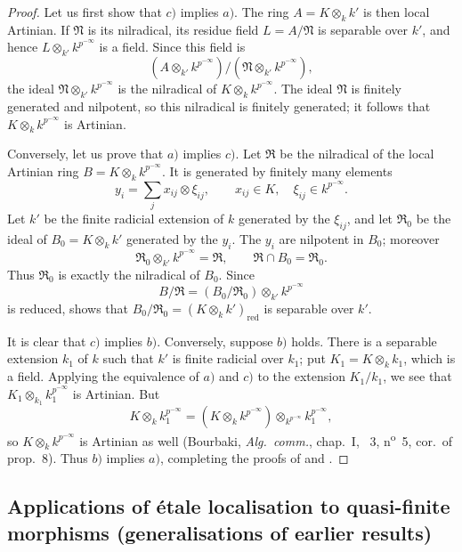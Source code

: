 \begin{proof}
Let us first show that $c)$ implies $a)$.
The ring $A=K\otimes_kk'$ is then local Artinian. If $\mathfrak N$ is its nilradical, its residue field $L=A/\mathfrak N$ is separable over $k'$, and hence $L\otimes_{k'}k^{p^{-\infty}}$ is a field. Since this field is
\[
  (A\otimes_{k'}k^{p^{-\infty}})/(\mathfrak N\otimes_{k'}k^{p^{-\infty}}),
\]
the ideal $\mathfrak N\otimes_{k'}k^{p^{-\infty}}$ is the nilradical of $K\otimes_kk^{p^{-\infty}}$. The ideal $\mathfrak N$ is finitely generated and nilpotent, so this nilradical is finitely generated; it follows that $K\otimes_kk^{p^{-\infty}}$ is Artinian.

Conversely, let us prove that $a)$ implies $c)$.
Let $\mathfrak R$ be the nilradical of the local Artinian ring $B=K\otimes_kk^{p^{-\infty}}$. It is generated by finitely many elements
\[
  y_i=\sum_j x_{ij}\otimes\xi_{ij},
  \qquad x_{ij}\in K,\quad \xi_{ij}\in k^{p^{-\infty}}.
\]
Let $k'$ be the finite radicial extension of $k$ generated by the $\xi_{ij}$, and let $\mathfrak R_0$ be the ideal of $B_0=K\otimes_kk'$ generated by the $y_i$. The $y_i$ are nilpotent in $B_0$; moreover
\[
  \mathfrak R_0\otimes_{k'}k^{p^{-\infty}}=\mathfrak R,
  \qquad
  \mathfrak R\cap B_0=\mathfrak R_0.
\]
Thus $\mathfrak R_0$ is exactly the nilradical of $B_0$. Since
\[
  B/\mathfrak R=(B_0/\mathfrak R_0)\otimes_{k'}k^{p^{-\infty}}
\]
is reduced,  shows that $B_0/\mathfrak R_0=(K\otimes_kk')_{\mathrm{red}}$ is separable over $k'$.

It is clear that $c)$ implies $b)$.
Conversely, suppose $b)$ holds. There is a separable extension $k_1$ of $k$ such that $k'$ is finite radicial over $k_1$; put $K_1=K\otimes_kk_1$, which is a field. Applying the equivalence of $a)$ and $c)$ to the extension $K_1/k_1$, we see that $K_1\otimes_{k_1}k_1^{p^{-\infty}}$ is Artinian. But
\[
  K\otimes_kk_1^{p^{-\infty}}
  =(K\otimes_kk^{p^{-\infty}})
   \otimes_{k^{p^{-\infty}}}k_1^{p^{-\infty}},
\]
so $K\otimes_kk^{p^{-\infty}}$ is Artinian as well (Bourbaki, \emph{Alg.\ comm.}, chap.~I, \textsection~3, n\textsuperscript{o}~5, cor.\ of prop.~8). Thus $b)$ implies $a)$, completing the proofs of  and .
\end{proof}


\subsection{Applications of \'etale localisation to quasi-finite morphisms (generalisations of earlier results)}
\label{subsection:IV.18.12}

